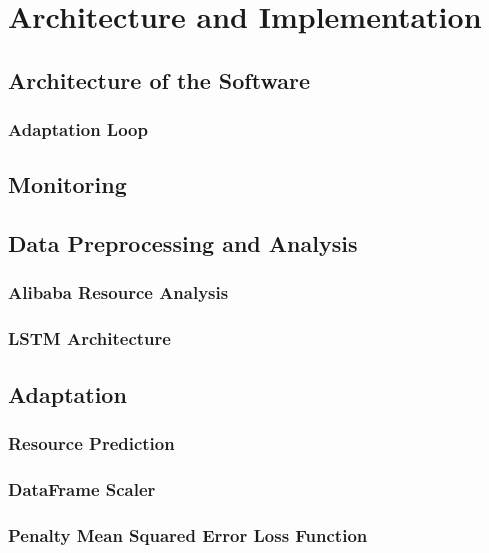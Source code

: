 \chapter{Architecture and Implementation}

\section{Architecture of the Software}

  \subsection{Adaptation Loop}

\section{Monitoring}

\section{Data Preprocessing and Analysis}

  \subsection{Alibaba Resource Analysis}
  \subsection{LSTM Architecture}

\section{Adaptation}
  \subsection{Resource Prediction}
  \subsection{DataFrame Scaler}
  \subsection{Penalty Mean Squared Error Loss Function}